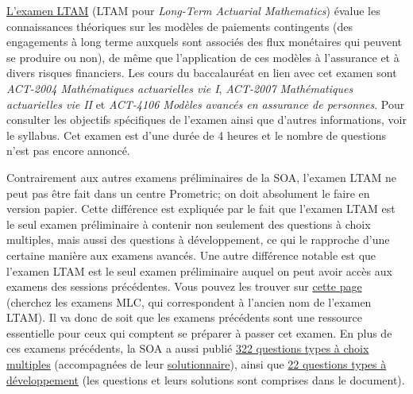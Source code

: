 \href{https://www.soa.org/Education/Exam-Req/edu-exam-ltam-detail.aspx}{L'examen LTAM} (LTAM pour \textit{Long-Term Actuarial Mathematics}) évalue les connaissances théoriques sur les modèles de paiements contingents (des engagements à long terme auxquels sont associés des flux monétaires qui peuvent se produire ou non), de même que l'application de ces modèles à l'assurance et à divers risques financiers.  Les cours du baccalauréat en lien avec cet examen sont \textit{ACT-2004 Mathématiques actuarielles vie I}, \textit{ACT-2007 Mathématiques actuarielles vie II} et \textit{ACT-4106 Modèles avancés en assurance de personnes}. Pour consulter les objectifs spécifiques de l'examen ainsi que d'autres informations, voir le syllabus. Cet examen est d'une durée de 4 heures et le nombre de questions n'est pas encore annoncé. \vspace{\baselineskip}

Contrairement aux autres examens préliminaires de la SOA, l'examen LTAM ne peut pas être fait dans un centre Prometric; on doit absolument le faire en version papier. Cette différence est expliquée par le fait que l'examen LTAM est le seul examen préliminaire à contenir non seulement des questions à choix multiples, mais aussi des questions à développement, ce qui le rapproche d'une certaine manière aux examens avancés. Une autre différence notable est que l'examen LTAM est le seul examen préliminaire auquel on peut avoir accès aux examens des sessions précédentes. Vous pouvez les trouver sur \href{https://www.soa.org/education/exam-req/syllabus-study-materials/edu-multiple-choice-exam.aspx}{cette page} (cherchez les examens MLC, qui correspondent à l'ancien nom de l'examen LTAM). Il va donc de soit que les examens précédents sont une ressource essentielle pour ceux qui comptent se préparer à passer cet examen. En plus de ces examens précédents, la SOA a aussi publié \href{http://www.soa.org/files/edu/edu-2014-spring-mlc-ques.pdf}{322 questions types à choix multiples} (accompagnées de leur \href{http://www.soa.org/files/edu/edu-2014-spring-mlc-sol.pdf}{solutionnaire}), ainsi que \href{http://www.soa.org/files/edu/edu-2014-spring-mlc-ques-sol.pdf}{22 questions types à développement} (les questions et leurs solutions sont comprises dans le document). \vspace{\baselineskip}

